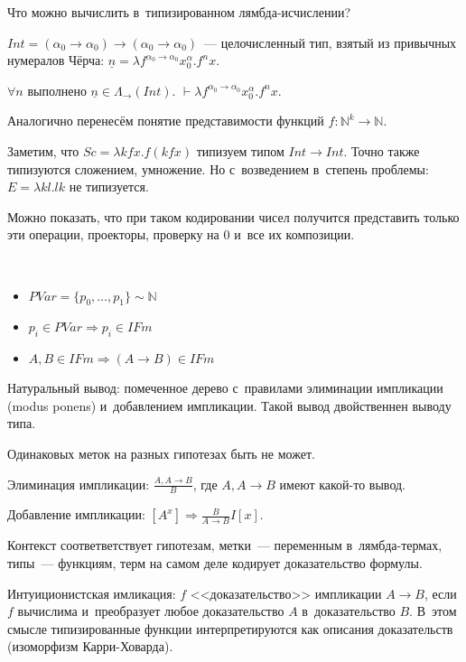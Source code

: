 \documentclass{article}
\begin{document}
Что можно вычислить в~типизированном лямбда-исчислении?

$Int = (\alpha_0 \rightarrow \alpha_0) \rightarrow (\alpha_0 \rightarrow \alpha_0)$~---
целочисленный тип, взятый из привычных нумералов Чёрча: $\underline{n} = \lambda f^{\alpha_0
\rightarrow \alpha_0} x^\alpha_0. f^n x$.

\begin{claim}
	$\forall n$ выполнено $\underline{n} \in \Lambda_\rightarrow(Int)$.
	$\vdash \lambda f^{\alpha_0 \rightarrow \alpha_0} x^\alpha_0.f^nx$.
\end{claim}

Аналогично перенесём понятие представимости функций $f: \mathbb{N}^k \rightarrow \mathbb{N}$.

Заметим, что $Sc = \lambda kfx.f(kfx)$ типизуем типом $Int \rightarrow Int$. Точно также типизуются
сложением, умножение. Но с~возведением в~степень проблемы: $E = \lambda kl.lk$ не типизуется.

Можно показать, что при таком кодировании чисел получится представить только эти операции,
проекторы, проверку на 0 и~все их композиции.

\begin{definition}~
	\begin{itemize}
		\item $PVar = \{p_0, \ldots, p_1\} \sim \mathbb{N}$
		\item $p_i \in PVar \Rightarrow p_i \in IFm$
		\item $A, B \in IFm \Rightarrow (A \rightarrow B) \in IFm$
	\end{itemize}

\end{definition}

Натуральный вывод: помеченное дерево с~правилами элиминации импликации (modus ponens) и~добавлением
импликации. Такой вывод двойственнен выводу типа.

Одинаковых меток на разных гипотезах быть не может.

Элиминация импликации: $\frac{A, A\rightarrow B}{B}$, где $A, A \rightarrow B$ имеют какой-то вывод.

Добавление импликации: $[A^x] \Rightarrow \frac{B}{A\rightarrow B} I[x]$.

Контекст соответветствует гипотезам, метки~--- переменным в~лямбда-термах, типы~--- функциям, терм
на самом деле кодирует доказательство формулы.

Интуиционистская имликация: $f$ <<доказательство>> импликации $A \rightarrow B$, если $f$ вычислима
и~преобразует любое доказательство $A$ в~доказательство $B$. В~этом смысле типизированные функции
интерпретируются как описания доказательств (изоморфизм Карри-Ховарда).
\end{document}

